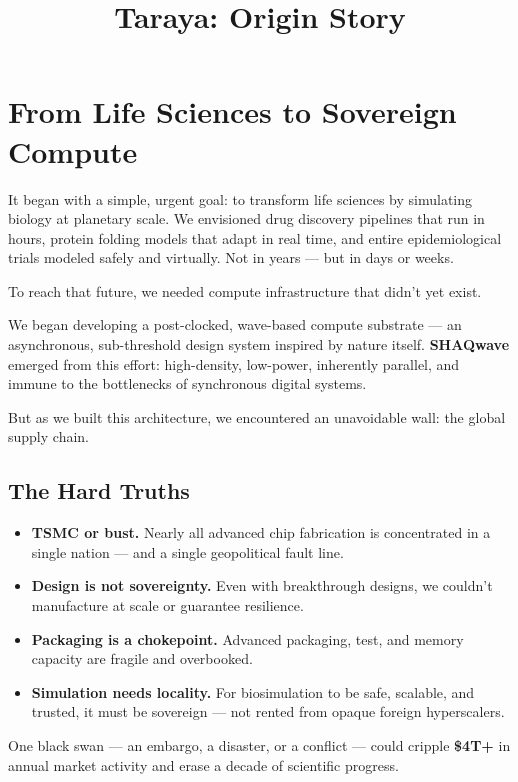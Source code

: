 \documentclass[11pt]{article}
\title{\textbf{Taraya: Origin Story}}
\date{}
\begin{document}
\maketitle

\section*{From Life Sciences to Sovereign Compute}

It began with a simple, urgent goal: to transform life sciences by simulating biology at planetary scale. We envisioned drug discovery pipelines that run in hours, protein folding models that adapt in real time, and entire epidemiological trials modeled safely and virtually. Not in years — but in days or weeks.

To reach that future, we needed compute infrastructure that didn’t yet exist.

We began developing a post-clocked, wave-based compute substrate — an asynchronous, sub-threshold design system inspired by nature itself. \textbf{SHAQwave} emerged from this effort: high-density, low-power, inherently parallel, and immune to the bottlenecks of synchronous digital systems.

But as we built this architecture, we encountered an unavoidable wall: the global supply chain.

\subsection*{The Hard Truths}

\begin{itemize}
  \item \textbf{TSMC or bust.} Nearly all advanced chip fabrication is concentrated in a single nation — and a single geopolitical fault line.
  \item \textbf{Design is not sovereignty.} Even with breakthrough designs, we couldn’t manufacture at scale or guarantee resilience.
  \item \textbf{Packaging is a chokepoint.} Advanced packaging, test, and memory capacity are fragile and overbooked.
  \item \textbf{Simulation needs locality.} For biosimulation to be safe, scalable, and trusted, it must be sovereign — not rented from opaque foreign hyperscalers.
\end{itemize}

One black swan --- an embargo, a disaster, or a conflict --- could cripple \textbf{\$4T+} in annual market activity and erase a decade of scientific progress.
\end{document}
